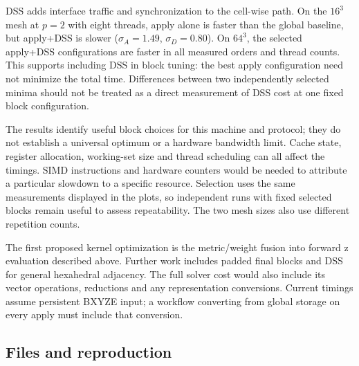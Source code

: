 \documentclass[11pt]{article}
\begin{document}
DSS adds interface traffic and synchronization to the cell-wise path.
On the \(16^3\) mesh at \(p=2\) with eight threads, apply alone is faster
than the global baseline, but apply+DSS is slower
(\(\sigma_A=1.49\), \(\sigma_D=0.80\)).
On \(64^3\), the selected apply+DSS configurations are faster in all measured
orders and thread counts. This supports including DSS in block tuning:
the best apply configuration need not minimize the total time.
Differences between two independently selected minima should not be treated
as a direct measurement of DSS cost at one fixed block configuration.

The results identify useful block choices for this machine and protocol;
they do not establish a universal optimum or a hardware bandwidth limit.
Cache state, register allocation, working-set size and thread scheduling
can all affect the timings. SIMD instructions and hardware counters would
be needed to attribute a particular slowdown to a specific resource.
Selection uses the same measurements displayed in the plots, so independent
runs with fixed selected blocks remain useful to assess repeatability.
The two mesh sizes also use different repetition counts.

The first proposed kernel optimization is the metric/weight fusion into
forward z evaluation described above. Further work includes padded final
blocks and DSS for general hexahedral adjacency. The full solver cost would
also include its vector operations, reductions and any representation
conversions. Current timings assume persistent BXYZE input; a workflow
converting from global storage on every apply must include that conversion.

\subsection{Files and reproduction}
\end{document}
